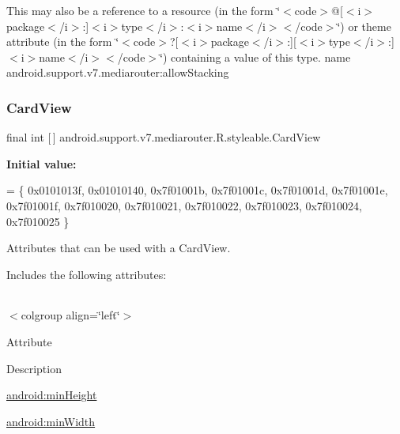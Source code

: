 This may also be a reference to a resource (in the form \char`\"{}$<$code$>$@\mbox{[}$<$i$>$package$<$/i$>$\+:\mbox{]}$<$i$>$type$<$/i$>$\+:$<$i$>$name$<$/i$>$$<$/code$>$\char`\"{}) or theme attribute (in the form \char`\"{}$<$code$>$?\mbox{[}$<$i$>$package$<$/i$>$\+:\mbox{]}\mbox{[}$<$i$>$type$<$/i$>$\+:\mbox{]}$<$i$>$name$<$/i$>$$<$/code$>$\char`\"{}) containing a value of this type.  name android.\+support.\+v7.\+mediarouter\+:allow\+Stacking \mbox{\label{classandroid_1_1support_1_1v7_1_1mediarouter_1_1R_1_1styleable_a58720bc744e6374c25e81b8ae15a2c6a}} 
\subsubsection{\texorpdfstring{Card\+View}{CardView}}
{\footnotesize\ttfamily final int \mbox{[}$\,$\mbox{]} android.\+support.\+v7.\+mediarouter.\+R.\+styleable.\+Card\+View\hspace{0.3cm}{\ttfamily [static]}}

{\bfseries Initial value\+:}
\begin{DoxyCode}
= \{
            0x0101013f, 0x01010140, 0x7f01001b, 0x7f01001c,
            0x7f01001d, 0x7f01001e, 0x7f01001f, 0x7f010020,
            0x7f010021, 0x7f010022, 0x7f010023, 0x7f010024,
            0x7f010025
        \}
\end{DoxyCode}
Attributes that can be used with a Card\+View. 

Includes the following attributes\+:

\tabulinesep=1mm
\begin{longtabu} spread 0pt [c]{*{0}{|X[-1]}|}
\hline
\end{longtabu}
$<$colgroup align=\char`\"{}left\char`\"{}$>$ 

Attribute

Description 

{\ttfamily \hyperlink{classandroid_1_1support_1_1v7_1_1mediarouter_1_1R_1_1styleable_afafa22bc1b39275635e284eb80eb592a}{android\+:min\+Height}}

{\ttfamily \hyperlink{classandroid_1_1support_1_1v7_1_1mediarouter_1_1R_1_1styleable_ae04c8a88a10b869c611ced6fea6170ca}{android\+:min\+Width}}

